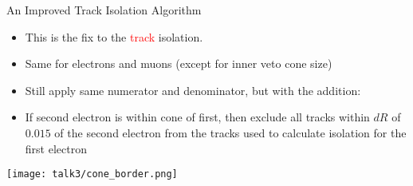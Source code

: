 \documentclass{beamer}
\begin{document}
\begin{frame}{An Improved Track Isolation Algorithm}%
  \begin{itemize}
    \item This is the fix to the \textcolor{red}{track} isolation.
    \item Same for electrons and muons (except for inner veto cone size)
    \item Still apply same numerator and denominator, but with the addition:
    \item If second electron is within cone of first, then exclude all tracks within $dR$ of $0.015$ of the second electron from the tracks used to calculate isolation for the first electron
  \end{itemize}

  \begin{center}
    \texttt{[image: talk3/cone\_border.png]}
  \end{center}

\end{frame}
\end{document}
